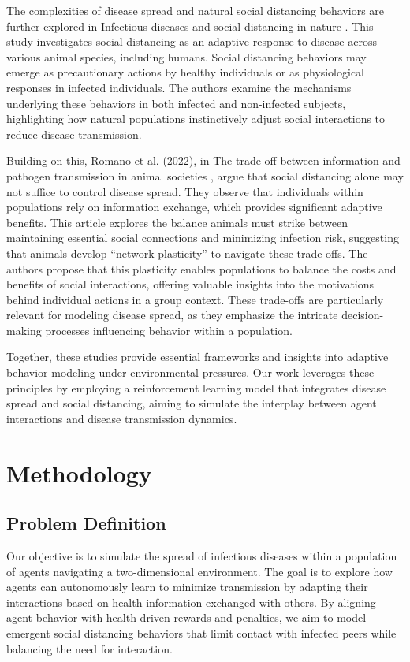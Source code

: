 \documentclass[9pt]{IEEEtran}
\begin{document}
The complexities of disease spread and natural social distancing behaviors are further explored in Infectious diseases and social distancing in nature \cite{stockmaier2021infectious}. This study investigates social distancing as an adaptive response to disease across various animal species, including humans. Social distancing behaviors may emerge as precautionary actions by healthy individuals or as physiological responses in infected individuals. The authors examine the mechanisms underlying these behaviors in both infected and non-infected subjects, highlighting how natural populations instinctively adjust social interactions to reduce disease transmission.

Building on this, Romano et al. (2022), in The trade-off between information and pathogen transmission in animal societies \cite{romano2022tradeoff}, argue that social distancing alone may not suffice to control disease spread. They observe that individuals within populations rely on information exchange, which provides significant adaptive benefits. This article explores the balance animals must strike between maintaining essential social connections and minimizing infection risk, suggesting that animals develop “network plasticity” to navigate these trade-offs. The authors propose that this plasticity enables populations to balance the costs and benefits of social interactions, offering valuable insights into the motivations behind individual actions in a group context. These trade-offs are particularly relevant for modeling disease spread, as they emphasize the intricate decision-making processes influencing behavior within a population.

Together, these studies provide essential frameworks and insights into adaptive behavior modeling under environmental pressures. Our work leverages these principles by employing a reinforcement learning model that integrates disease spread and social distancing, aiming to simulate the interplay between agent interactions and disease transmission dynamics.

\section{Methodology}

\subsection{Problem Definition}

Our objective is to simulate the spread of infectious diseases within a population of agents navigating a two-dimensional environment. The goal is to explore how agents can autonomously learn to minimize transmission by adapting their interactions based on health information exchanged with others. By aligning agent behavior with health-driven rewards and penalties, we aim to model emergent social distancing behaviors that limit contact with infected peers while balancing the need for interaction.
\end{document}

